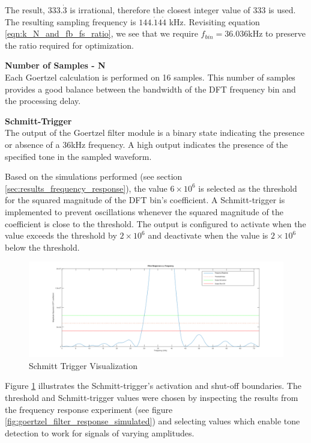 The result, $333.\dot{3}$ is irrational, therefore the closest integer value of 333 is used. The resulting sampling frequency is $144.\dot{1}4\dot{4}$ kHz. Revisiting equation \ref{eqn:k_N_and_fb_fs_ratio}, we see that we require $f_{bin} = 36.036$kHz to preserve the ratio required for optimization.

\textbf{Number of Samples - N}\\
Each Goertzel calculation is performed on 16 samples. This number of samples provides a good balance between the bandwidth of the DFT frequency bin and the processing delay.

\textbf{Schmitt-Trigger}\\
The output of the Goertzel filter module is a binary state indicating the presence or absence of a 36kHz frequency. A high output indicates the presence of the specified tone in the sampled waveform.

Based on the simulations performed (see section \ref{sec:results_frequency_response}), the value $6\times 10^{6}$ is selected as the threshold for the squared magnitude of the DFT bin's coefficient. A Schmitt-trigger is implemented to prevent oscillations whenever the squared magnitude of the coefficient is close to the threshold. The output is configured to activate when the value exceeds the threshold by $2\times 10^{6}$ and deactivate when the value is $2\times 10^{6}$ below the threshold.

\begin{figure}[H]
	\centering
	\includegraphics[width=.8\textwidth]{figures/design/schmit_simulation_wide.png}
	\caption{Schmitt Trigger Visualization}
	\label{fig:schmit_simulation_wide}
\end{figure}

Figure \ref{fig:schmit_simulation_wide} illustrates the Schmitt-trigger's activation and shut-off boundaries. The threshold and Schmitt-trigger values were chosen by inspecting the results from the frequency response experiment (see figure \ref{fig:goertzel_filter_response_simulated}) and selecting values which enable tone detection to work for signals of varying amplitudes.



